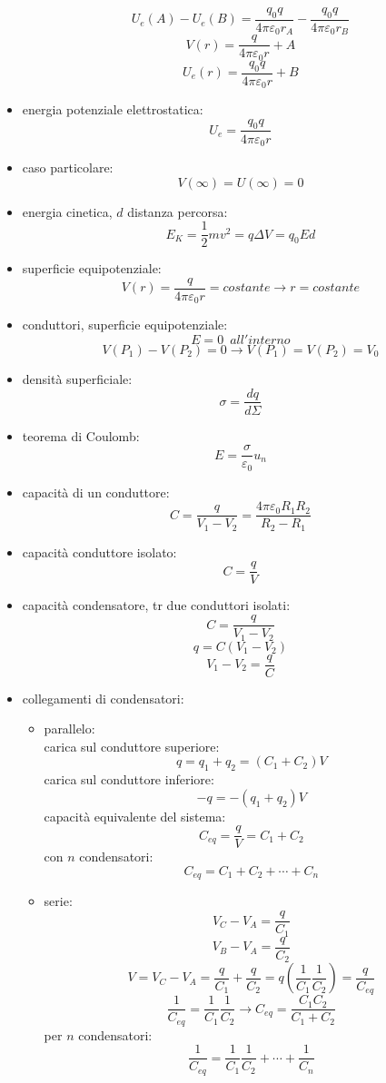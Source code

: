 \documentclass[a4paper,12pt, oneside]{book}
\begin{document}
\begin{itemize}
	      $$U_e(A)-U_e(B)=\frac{q_0q}{4\pi\varepsilon_0r_A}-\frac{q_0q}{4\pi\varepsilon_0r_B}$$
	      $$V(r)=\frac{q}{4\pi\varepsilon_0r}+A$$
	      $$U_e(r)=\frac{q_0q}{4\pi\varepsilon_0r}+B$$
	\item energia potenziale elettrostatica:
	      $$U_e=\frac{q_0q}{4\pi\varepsilon_0r}$$
	\item caso particolare:
	      $$V(\infty)=U(\infty)=0$$
	\item energia cinetica, $d$ distanza percorsa:
	      $$E_K=\frac{1}{2}mv^2=q\Delta V=q_0Ed$$
	\item superficie equipotenziale:
	      $$V(r)=\frac{q}{4\pi\varepsilon_0r}=costante\longrightarrow r=costante$$
	\item conduttori, superficie equipotenziale:
	      $$E=0\,\,\,all'interno$$
	      $$V(P_1)-V(P_2)=0\longrightarrow V(P_1)=V(P_2)=V_0$$
	\item densità superficiale:
	      $$\sigma=\frac{dq}{d\Sigma}$$
	\item teorema di Coulomb:
	      $$E=\frac{\sigma}{\varepsilon_0}u_n$$
	\item capacità di un conduttore:
	      $$C=\frac{q}{V_1-V_2}=\frac{4\pi\varepsilon_0R_1R_2}{R_2-R_1}$$
	\item capacità conduttore isolato:
	      $$C=\frac{q}{V}$$
	\item capacità condensatore, tr due conduttori isolati:
	      $$C=\frac{q}{V_1-V_2}$$
	      $$q=C(V_1-V_2)$$
	      $$V_1-V_2=\frac{q}{C}$$
	\item collegamenti di condensatori:
	      \begin{itemize}
		      \item parallelo:\\
		            carica sul conduttore superiore:
		            $$q=q_1+q_2=(C_1+C_2)V$$
		            carica sul conduttore inferiore:
		            $$-q=-(q_1+q_2)V$$
		            capacità equivalente del sistema:
		            $$C_{eq}=\frac{q}{V}=C_1+C_2$$
		            con $n$ condensatori:
		            $$C_{eq}=C_1+C_2+\cdots+C_n$$
		      \item serie:
		            $$V_C-V_A=\frac{q}{C_1}$$
		            $$V_B-V_A=\frac{q}{C_2}$$
		            $$V=V_C-V_A=\frac{q}{C_1}+\frac{q}{C_2}=q\left(\frac{1}{C_1}\frac{1}{C_2}\right)=\frac{q}{C_{eq}}$$
		            $$\frac{1}{C_{eq}}=\frac{1}{C_1}\frac{1}{C_2}\longrightarrow C_{eq}=\frac{C_1C_2}{C_1+C_2}$$
		            per $n$ condensatori:
		            $$\frac{1}{C_{eq}}=\frac{1}{C_1}\frac{1}{C_2}+\cdots+\frac{1}{C_n}$$

\end{itemize}
\end{itemize}
\end{document}
